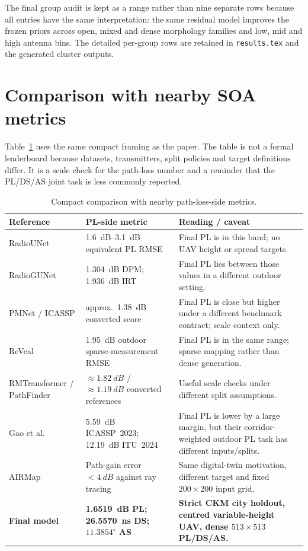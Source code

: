 The final group audit is kept as a range rather than nine separate rows because
all entries have the same interpretation: the same residual model improves the
frozen priors across open, mixed and dense morphology families and low, mid and
high antenna bins. The detailed per-group rows are retained in
\texttt{results.tex} and the generated cluster outputs.

\section{Comparison with nearby SOA metrics}

Table~\ref{tab:soa_result_comparison} uses the same compact framing as the
paper. The table is not a formal leaderboard because datasets, transmitters,
split policies and target definitions differ. It is a scale check for the
path-loss number and a reminder that the PL/DS/AS joint task is less commonly
reported.

\begin{table}[htbp]
\centering
\caption{Compact comparison with nearby path-loss-side metrics.}
\label{tab:soa_result_comparison}
\scriptsize
\setlength{\tabcolsep}{3pt}
\begin{tabularx}{\textwidth}{p{}p{}X}
\toprule
Reference & PL-side metric & Reading / caveat \\
\midrule
RadioUNet \cite{radiounet2020} & \SI{1.6}{dB}--\SI{3.1}{dB} equivalent PL RMSE & Final PL is in this band; no UAV height or spread targets. \\
RadioGUNet \cite{radiogunet2025} & \SI{1.304}{dB} DPM; \SI{1.936}{dB} IRT & Final PL lies between those values in a different outdoor setting. \\
PMNet / ICASSP \cite{pmnet_icassp2023,icassp2023challenge} & approx.\ \SI{1.38}{dB} converted score & Final PL is close but higher under a different benchmark contract; scale context only. \\
ReVeal \cite{reveal2025} & \SI{1.95}{dB} outdoor sparse-measurement RMSE & Final PL is in the same range; sparse mapping rather than dense generation. \\
RMTransformer / PathFinder \cite{rmtransformer2025,pathfinder2025} & \(\approx\SI{1.82}{dB}\) / \(\approx\SI{1.19}{dB}\) converted references & Useful scale checks under different split assumptions. \\
Gao et al.\ \cite{gao2026} & \SI{5.59}{dB} ICASSP~2023; \SI{12.19}{dB} ITU~2024 & Final PL is lower by a large margin, but their corridor-weighted outdoor PL task has different inputs/splits. \\
AIRMap \cite{airmap2025} & Path-gain error \(<\SI{4}{dB}\) against ray tracing & Same digital-twin motivation, different target and fixed \(200\times200\) input grid. \\
\textbf{Final model} & \textbf{\SI{1.6519}{dB} PL; \SI{26.5570}{ns} DS; \(11.3854^\circ\) AS} & \textbf{Strict CKM city holdout, centred variable-height UAV, dense \(513\times513\) PL/DS/AS.} \\
\bottomrule
\end{tabularx}
\end{table}

